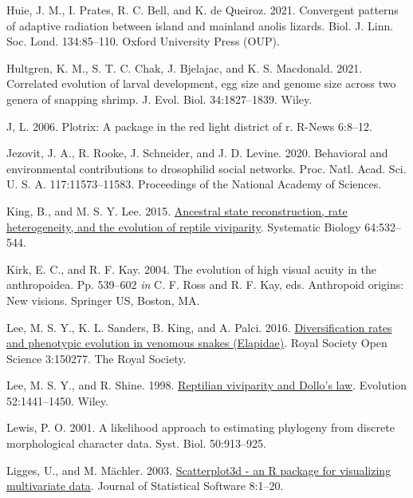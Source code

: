 \documentclass[fleqn,10pt,lineno]{wlpeerj} %
\newlength{\cslhangindent}
\newlength{\cslentryspacingunit} %
\newenvironment{CSLReferences}[2] %
 {%
  \setlength{\parindent}{0pt}
  \ifodd #1
  \let\oldpar\par
  \def\par{\hangindent=\cslhangindent\oldpar}
  \fi
  \setlength{\parskip}{#2\cslentryspacingunit}
 }%
 {}
\begin{document}
\begin{CSLReferences}{1}{0}
\leavevmode{}%
Huie, J. M., I. Prates, R. C. Bell, and K. de Queiroz. 2021. Convergent patterns of adaptive radiation between island and mainland anolis lizards. Biol. J. Linn. Soc. Lond. 134:85--110. Oxford University Press (OUP).

\leavevmode{}%
Hultgren, K. M., S. T. C. Chak, J. Bjelajac, and K. S. Macdonald. 2021. Correlated evolution of larval development, egg size and genome size across two genera of snapping shrimp. J. Evol. Biol. 34:1827--1839. Wiley.

\leavevmode{}%
J, L. 2006. Plotrix: A package in the red light district of r. R-News 6:8--12.

\leavevmode{}%
Jezovit, J. A., R. Rooke, J. Schneider, and J. D. Levine. 2020. Behavioral and environmental contributions to drosophilid social networks. Proc. Natl. Acad. Sci. U. S. A. 117:11573--11583. Proceedings of the National Academy of Sciences.

\leavevmode{}%
King, B., and M. S. Y. Lee. 2015. \href{https://doi.org/10.1093/sysbio/syv005}{Ancestral state reconstruction, rate heterogeneity, and the evolution of reptile viviparity}. Systematic Biology 64:532--544.

\leavevmode{}%
Kirk, E. C., and R. F. Kay. 2004. The evolution of high visual acuity in the anthropoidea. Pp. 539--602 \emph{in} C. F. Ross and R. F. Kay, eds. Anthropoid origins: New visions. Springer US, Boston, MA.

\leavevmode{}%
Lee, M. S. Y., K. L. Sanders, B. King, and A. Palci. 2016. \href{https://doi.org/10.1098/rsos.150277}{Diversification rates and phenotypic evolution in venomous snakes ({E}lapidae)}. Royal Society Open Science 3:150277. The Royal Society.

\leavevmode{}%
Lee, M. S. Y., and R. Shine. 1998. \href{https://doi.org/10.1111/j.1558-5646.1998.tb02025.x}{Reptilian viviparity and {D}ollo's law}. Evolution 52:1441--1450. Wiley.

\leavevmode{}%
Lewis, P. O. 2001. A likelihood approach to estimating phylogeny from discrete morphological character data. Syst. Biol. 50:913--925.

\leavevmode{}%
Ligges, U., and M. Mächler. 2003. \href{https://doi.org/10.18637/jss.v008.i11}{Scatterplot3d - an {R} package for visualizing multivariate data}. Journal of Statistical Software 8:1--20.


\end{CSLReferences}
\end{document}
